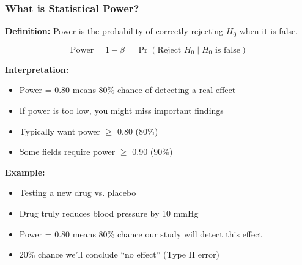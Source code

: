 \documentclass{beamer}
\begin{document}
\begin{frame}
\frametitle{What is Statistical Power?}
\textbf{Definition:} Power is the probability of correctly rejecting $H_0$ when it is false.

$$\text{Power} = 1 - \beta = \Pr(\text{Reject } H_0 \mid H_0 \text{ is false})$$

\vspace{0.5cm}
\textbf{Interpretation:}
\begin{itemize}
\item Power = 0.80 means 80\% chance of detecting a real effect
\item If power is too low, you might miss important findings
\item Typically want power $\geq$ 0.80 (80\%)
\item Some fields require power $\geq$ 0.90 (90\%)
\end{itemize}

\vspace{0.5cm}
\textbf{Example:}
\begin{itemize}
\item Testing a new drug vs. placebo
\item Drug truly reduces blood pressure by 10 mmHg
\item Power = 0.80 means 80\% chance our study will detect this effect
\item 20\% chance we'll conclude ``no effect'' (Type II error)
\end{itemize}
\end{frame}
\end{document}
